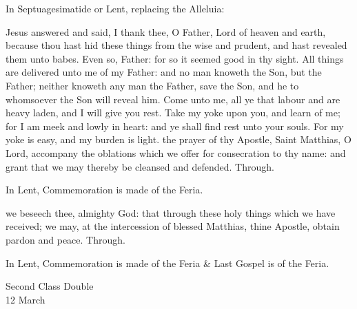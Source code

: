 \begin{rubric}
{In Septuagesimatide or Lent, replacing the Alleluia:}
\end{rubric}\par\noindent


 Jesus answered and said, I thank thee, O Father, Lord of heaven and earth, because thou hast hid these things from the wise and prudent, and hast revealed them unto babes. Even so, Father: for so it seemed good in thy sight. All things are delivered unto me of my Father: and no man knoweth the Son, but the Father; neither knoweth any man the Father, save the Son, and he to whomsoever the Son will reveal him. Come unto me, all ye that labour and are heavy laden, and I will give you rest. Take my yoke upon you, and learn of me; for I am meek and lowly in heart: and ye shall find rest unto your souls. For my yoke is easy, and my burden is light.
\secret
{} the prayer of thy Apostle, Saint Matthias, O Lord, accompany the oblations which we offer for consecration to thy name: and grant that we may thereby be cleansed and defended. Through.
\begin{rubric}
    In Lent, Commemoration is made of the Feria.%
\end{rubric}
\postcommunion
{} we beseech thee, almighty God: that through these holy things which we have received; we may, at the intercession of blessed Matthias, thine Apostle, obtain pardon and peace. Through.
\begin{rubric}
    In Lent, Commemoration is made of the Feria \& Last Gospel is of the Feria.
\end{rubric}

\begin{inhead}
    {Second Class Double\\
12 March}
\end{inhead}

